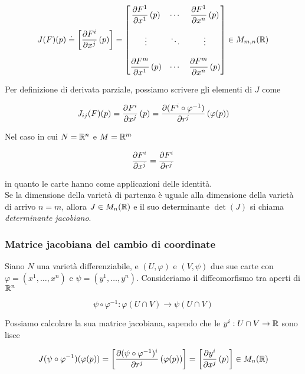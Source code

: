 \begin{equation}
	J(F)(p) \doteq \left[ \pdv{F^{i}}{x^{j}} \, (p) \right] %
	= \bmqty{ %
				\dpdv{F^{1}}{x^{1}} \, (p) & \cdots & \dpdv{F^{1}}{x^{n}} \, (p) \\ \\
				\vdots & \ddots & \vdots \\ \\
				\dpdv{F^{m}}{x^{1}} \, (p) & \cdots & \dpdv{F^{m}}{x^{n}} \, (p)
		 		} %
	\in M_{m,n}(\R)
\end{equation}

Per definizione di derivata parziale, possiamo scrivere gli elementi di $ J $ come

\begin{equation}
	J_{ij}(F)(p) = \pdv{F^{i}}{x^{j}} \, (p) = \pdv{(F^{i} \circ \varphi^{-1})}{r^{j}} \, (\varphi(p))
\end{equation}

Nel caso in cui $ N = \mathbb{R}^{n} $ e $ M = \mathbb{R}^{m} $

\begin{equation}
	\pdv{F^{i}}{x^{j}} = \pdv{F^{i}}{r^{j}}
\end{equation}

in quanto le carte hanno come applicazioni delle identità. \\
Se la dimensione della varietà di partenza è uguale alla dimensione della varietà di arrivo $ n=m $, allora $ J \in M_{n}(\mathbb{R}) $ e il suo determinante $ \det(J) $ si chiama \textit{determinante jacobiano}.

\subsubsection{Matrice jacobiana del cambio di coordinate}

Siano $ N $ una varietà differenziabile, e $ (U,\varphi) $ e $ (V,\psi) $ due sue carte con $ \varphi = (x^{1},\dots,x^{n}) $ e $ \psi = (y^{1},\dots,y^{n}) $. Consideriamo il diffeomorfismo tra aperti di $ \mathbb{R}^{n} $

\begin{equation}
	\psi \circ \varphi^{-1} : \varphi(U \cap V) \to \psi(U \cap V)
\end{equation}

Possiamo calcolare la sua matrice jacobiana, sapendo che le $ y^{i} : U \cap V \to \mathbb{R} $ sono lisce

\begin{equation}
	J(\psi \circ \varphi^{-1})(\varphi(p)) = \left[ \pdv{(\psi \circ \varphi^{-1})^{i}}{r^{j}} \, (\varphi(p)) \right] %
	= \left[ \pdv{y^{i}}{x^{j}} \, (p) \right] \in M_{n}(\R)
\end{equation}

